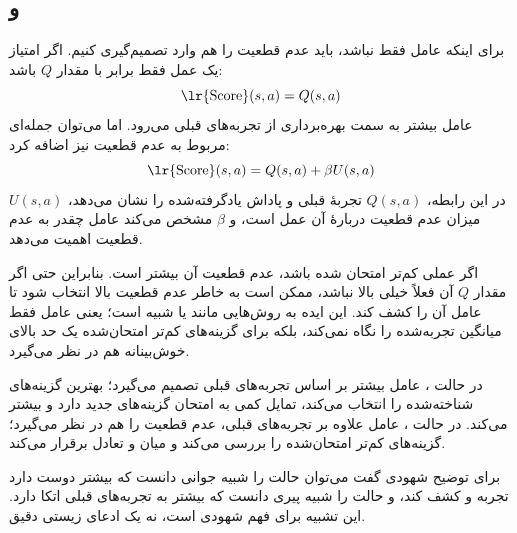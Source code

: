 \subsection{ و }
برای اینکه عامل فقط  نباشد، باید عدم قطعیت را هم وارد تصمیم‌گیری کنیم. اگر امتیاز یک عمل فقط برابر با مقدار \(Q\) باشد:
\[
\text{\lr{Score}}(s,a)=Q(s,a)
\]
عامل بیشتر به سمت بهره‌برداری از تجربه‌های قبلی می‌رود. اما می‌توان جمله‌ای مربوط به عدم قطعیت نیز اضافه کرد:
\[
\text{\lr{Score}}(s,a)=Q(s,a)+\beta U(s,a)
\]
در این رابطه، \(Q(s,a)\) تجربهٔ قبلی و پاداش یادگرفته‌شده را نشان می‌دهد، \(U(s,a)\) میزان عدم قطعیت دربارهٔ آن عمل است، و \(\beta\) مشخص می‌کند عامل چقدر به عدم قطعیت اهمیت می‌دهد.

اگر عملی کم‌تر امتحان شده باشد، عدم قطعیت آن بیشتر است. بنابراین حتی اگر مقدار \(Q\) آن فعلاً خیلی بالا نباشد، ممکن است به خاطر عدم قطعیت بالا انتخاب شود تا عامل آن را کشف کند. این ایده به روش‌هایی مانند  یا  شبیه است؛ یعنی عامل فقط میانگین تجربه‌شده را نگاه نمی‌کند، بلکه برای گزینه‌های کم‌تر امتحان‌شده یک حد بالای خوش‌بینانه هم در نظر می‌گیرد.

در حالت ، عامل بیشتر بر اساس تجربه‌های قبلی تصمیم می‌گیرد؛ بهترین گزینه‌های شناخته‌شده را انتخاب می‌کند، تمایل کمی به امتحان گزینه‌های جدید دارد و بیشتر  می‌کند. در حالت ، عامل علاوه بر تجربه‌های قبلی، عدم قطعیت را هم در نظر می‌گیرد؛ گزینه‌های کم‌تر امتحان‌شده را بررسی می‌کند و میان  و  تعادل برقرار می‌کند.

برای توضیح شهودی گفت می‌توان حالت  را شبیه جوانی دانست که بیشتر دوست دارد تجربه و کشف کند، و حالت  را شبیه پیری دانست که بیشتر به تجربه‌های قبلی اتکا دارد. این تشبیه برای فهم شهودی است، نه یک ادعای زیستی دقیق.

